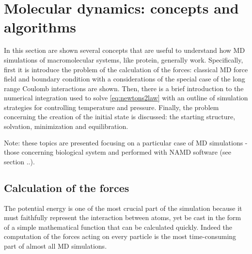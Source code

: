 \section{Molecular dynamics: concepts and algorithms}

In this section are shown several concepts that are useful to understand how MD simulations of macromolecular systems, like protein, generally work. Specifically, first it is introduce the problem of the calculation of the forces: classical MD force field and boundary condition with a considerations of the special case of the long range Coulomb interactions are shown. Then, there is a brief introduction to the numerical integration used to solve \eqref{eq:newtons2law} with an outline of simulation strategies for controlling temperature and pressure. Finally, the problem concerning the creation of the initial state is discussed: the starting structure, solvation, minimization and equilibration.

Note: these topics are presented focusing on a particular case of MD simulations - those concerning biological system and performed with NAMD software (see section ..). 


\subsection{Calculation of the forces}
The potential energy is one of the most crucial part of the simulation because it must faithfully represent the interaction between atoms, yet be cast in the form of a simple mathematical function that can be calculated quickly. Indeed the computation of the forces acting on every particle is the most time-consuming part of almost all MD simulations.


